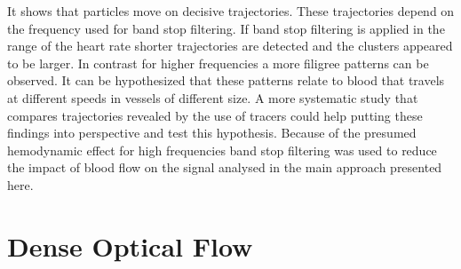  It shows that particles move on decisive trajectories. These trajectories depend on the frequency used for band stop filtering. If band stop filtering is applied in the range of the heart rate shorter trajectories are detected and the clusters appeared to be larger. In contrast for higher frequencies a more filigree patterns can be observed. It can be hypothesized that these patterns relate to blood that travels at different speeds in vessels of different size. A more systematic study that compares trajectories revealed by the use of tracers could help putting these findings into perspective and test this hypothesis. Because of the presumed hemodynamic effect for high frequencies band stop filtering was used to reduce the impact of blood flow on the signal analysed in the main approach presented here.

\section{Dense Optical Flow}

